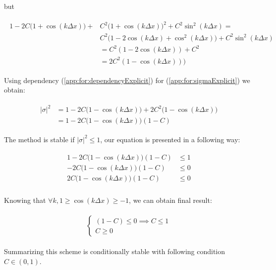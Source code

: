 	but
	
	\begin{align}
		\begin{split}
			\label{app:for:dependencyExplicit}
			1 - 2C\Big(1 + \cos(k\Delta x)\Big) + &C^2\Big(1 +\cos(k\Delta x)\Big)^2 + C^2\sin^2(k\Delta x) = \\&C^2\Bigg(1 - 2\cos(k\Delta x) + \cos^2(k\Delta x)\Bigg) + C^2\sin^2(k\Delta x) \\
			&= C^2(1-2\cos(k\Delta x)) + C^2 \\
			&= 2C^2(1-\cos(k\Delta x)))
		\end{split}
	\end{align} 
	
	Using dependency (\ref{app:for:dependencyExplicit}) for (\ref{app:for:sigmaExplicit}) we obtain:
	
	\begin{align}
		\begin{split}
			|\sigma|^2 &= 1 - 2C\Big(1-\cos(k\Delta x)\Big) + 2C^2\Big(1 - \cos(k\Delta x)\Big) \\
			&= 1-2C\Big(1-\cos(k\Delta x)\Big)(1-C)
		\end{split}
	\end{align} 
	
	The method is stable if $|\sigma|^2 \leq 1$, our equation is presented in a following way:
	
	\begin{align}
		\begin{split}
			1-2C\Big(1-\cos(k\Delta x)\Big)(1-C) &\leq 1 \\
			-2C\Big(1-\cos(k\Delta x)\Big)(1-C) &\leq 0 \\
			2C\Big(1-\cos(k\Delta x)\Big)(1-C) &\leq0 \\
		\end{split}
	\end{align} 
	
	Knowing that $ \forall k,  1 \geq \cos(k\Delta x) \geq -1$, we can obtain final result:
	
	\begin{align}
		\begin{split}
			\begin{cases}
				(1-C) \leq 0 \implies C \leq 1 \\
				C \geq 0
			\end{cases}
		\end{split}
	\end{align} 
	
	Summarizing this scheme is conditionally stable with following condition $C \in \left(0, 1\right)$.
	
	
	